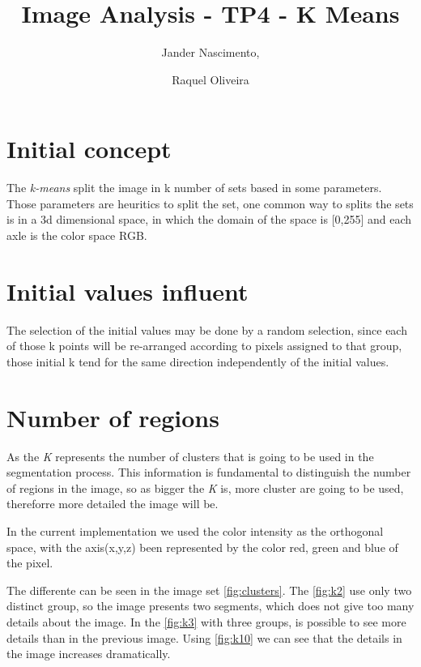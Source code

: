 \documentclass{article}
\begin{document}
\title{Image Analysis - TP4 - K Means}

\author{Jander Nascimento, 
\and Raquel Oliveira}

\maketitle

\section{Initial concept}

The \emph{k-means} split the image in k number of sets based in some parameters. Those parameters are heuritics to split the set, one common way to splits the sets is in a 3d dimensional space, in which the domain of the space is [0,255] and each axle is the color space RGB. 

\section{Initial values influent}

The selection of the initial values may be done by a random selection, since each of those k points will be re-arranged according to pixels assigned to that group, those initial k tend for the same direction independently of the initial values.

\section{Number of regions}

As the \emph{K} represents the number of clusters that is going to be used in the segmentation process. 
This information is fundamental to distinguish the number of regions in the image, so as bigger the \emph{K} is, more cluster are going to be used, thereforre more detailed the image will be.  

In the current implementation we used the color intensity as the orthogonal space, with the axis(x,y,z) been represented by the color red, green and blue of the pixel.

The differente can be seen in the image set \ref{fig:clusters}. The \ref{fig:k2} use only two distinct group, so the image presents two segments, which does not give too many details about the image.  In the \ref{fig:k3} with three groups, is possible to see more details than in the previous image. Using \ref{fig:k10} we can see that the details in the image increases dramatically.
\end{document}

